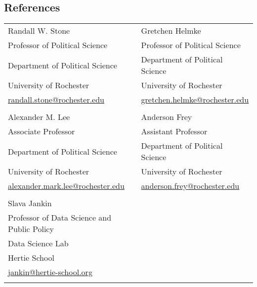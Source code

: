 \documentclass[margin,line,11pt]{res}
\begin{document}
\begin{resume}
\section{\sc References}
\hskip 18pt
\begin{tabular}{ll}
	Randall W. Stone                   & Gretchen Helmke  \\
	Professor of Political Science              & Professor of Political Science\\
	Department of Political Science     & Department of Political Science  \\
	University of Rochester             & University of Rochester \\
\href{mailto:randall.stone@rochester.edu}{randall.stone@rochester.edu}& \href{mailto:gretchen.helmke@rochester.edu}{gretchen.helmke@rochester.edu}\\
\\
	Alexander M. Lee                     & Anderson Frey  \\
	Associate Professor                 & Assistant Professor\\
	Department of Political Science     & Department of Political Science  \\
	University of Rochester             & University of Rochester \\
 \href{mailto:alexander.mark.lee@rochester.edu}{alexander.mark.lee@rochester.edu}&
 	\href{mailto:anderson.frey@rochester.edu}{anderson.frey@rochester.edu}\\
 	\\
 		Slava Jankin                   & \\
 	Professor of Data Science and Public Policy              & \\
 	Data Science Lab     &   \\
 	Hertie School             &  \\
 	\href{mailto:jankin@hertie-school.org}{jankin@hertie-school.org}& \\
 	\\
\end{tabular}



\thispagestyle{updated}

\end{resume}
\end{document}

